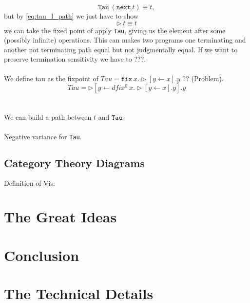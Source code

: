 \documentclass[twoside,11pt,openright]{report}
\begin{document}
\begin{equation}
  \mathtt{Tau}~(\mathtt{next}~t) \equiv t,
\end{equation}
but by \eqref{eq:tau_l_path} we just have to show
\begin{equation}
  \triangleright~t \equiv t
\end{equation}
we can take the fixed point of apply \texttt{Tau}, giving us the element after some (possibly infinite) operations. This can makes two programs one terminating and another not terminating path equal but not judgmentally equal. If we want to preserve termination sensitivity we have to ???.
\\ \\
We define tau as the fixpoint of \(Tau = \mathtt{fix}~x.\triangleright[y \leftarrow x].y\) ?? (Problem).
\[Tau = \triangleright[y \leftarrow dfix^0~x.\triangleright[y \leftarrow x].y].y\]
\\ \\
We can build a path between \(t\) and \(\mathtt{Tau}\)
\\ \\
Negative variance for \texttt{Tau}.

\section{Category Theory Diagrams}
Definition of Vis:
\begin{center}
\end{center}

\chapter{The Great Ideas}
\label{ch:main}


\chapter{Conclusion}
\label{ch:conclusion}



\cleardoublepage
{}
 



\cleardoublepage
\appendix
\chapter{The Technical Details}

\todo[inline]{\dots}
\end{document}
